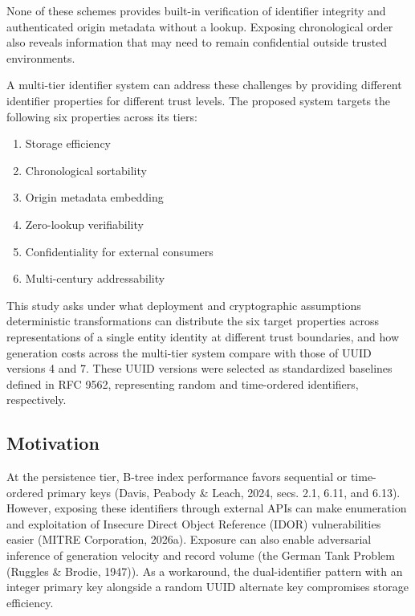 \documentclass[fleqn,10pt,lineno]{wlpeerj}
\providecommand{\tightlist}{%
  \setlength{\itemsep}{0pt}\setlength{\parskip}{0pt}}
\begin{document}
None of these schemes provides built-in verification of identifier
integrity and authenticated origin metadata without a lookup. Exposing
chronological order also reveals information that may need to remain
confidential outside trusted environments.

A multi-tier identifier system can address these challenges by providing
different identifier properties for different trust levels. The proposed
system targets the following six properties across its tiers:

\begin{enumerate}
\def\labelenumi{\arabic{enumi}.}
\tightlist
\item
  Storage efficiency
\item
  Chronological sortability
\item
  Origin metadata embedding
\item
  Zero-lookup verifiability
\item
  Confidentiality for external consumers
\item
  Multi-century addressability
\end{enumerate}

This study asks under what deployment and cryptographic assumptions
deterministic transformations can distribute the six target properties
across representations of a single entity identity at different trust
boundaries, and how generation costs across the multi-tier system
compare with those of UUID versions 4 and 7. These UUID versions were
selected as standardized baselines defined in RFC 9562, representing
random and time-ordered identifiers, respectively.

\subsection{Motivation}\label{motivation}

At the persistence tier, B-tree index performance favors sequential or
time-ordered primary keys (Davis, Peabody \& Leach, 2024, secs. 2.1,
6.11, and 6.13). However, exposing these identifiers through external
APIs can make enumeration and exploitation of Insecure Direct Object
Reference (IDOR) vulnerabilities easier (MITRE Corporation, 2026a).
Exposure can also enable adversarial inference of generation velocity
and record volume (the German Tank Problem (Ruggles \& Brodie, 1947)).
As a workaround, the dual-identifier pattern with an integer primary key
alongside a random UUID alternate key compromises storage efficiency.
\end{document}
